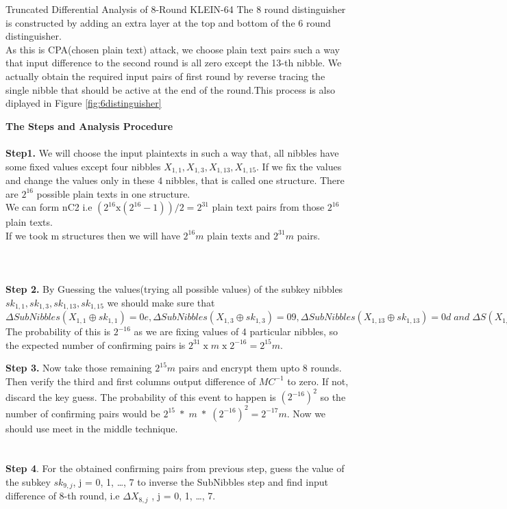 \begin{frame}{Truncated Differential Analysis of 8-Round KLEIN-64}
The 8 round distinguisher is constructed by adding an extra layer at the top and bottom of the 6 round distinguisher.\\
As this is CPA(chosen plain text) attack, we choose plain text pairs such a way that input difference to the second round is all zero except the 13-th nibble. We actually obtain the required input pairs of first round by reverse tracing the single nibble that should be active at the end of the round.This process is also diplayed in Figure \ref{fig:6distinguisher} \\
\end{frame}
\begin{frame}
\textbf{ The Steps and Analysis Procedure}\\ \\
\textbf{Step1.} We will choose the input plaintexts in such a way that, all nibbles have some fixed values except four nibbles $X_{1,1} , X_{1,3} , X_{1,13} , X_{1,15}$. If we fix the values and change the values only in these 4 nibbles, that is called one structure. There are $2^{16}$ possible plain texts in one structure.\\
We can form nC2 i.e $(2^{16} \text{x} (2^{16} - 1))/2 = 2^{31}$ plain text pairs from those $2^{16} $ plain texts.\\ If we took m structures then we will have $2^{16}m$ plain texts and $2^{31}m$ pairs.\\ \\ \\ \\
\textbf{Step 2.} By Guessing the values(trying all possible values)  of the subkey nibbles $sk_{1,1} , sk_{1,3} , sk_{1,13} , sk_{1,15}$ we should make sure that $\Delta SubNibbles(X_{1,1} \oplus sk_{1,1} ) = 0e, \Delta SubNibbles(X_{1,3} \oplus sk_{1,3} ) = 09, \Delta SubNibbles(X_{1,13} \oplus sk_{1,13} ) =
0d\; and \;\Delta S(X_{1,15} \oplus sk_{1,15} ) = 0b.$ The probability of this is $2^{-16}$ as we are fixing values of 4 particular nibbles, so the expected number of confirming pairs is $2^{31} \;\text{x}\; m\; \text{x} \;2^{-16} = 2^{15} m$. 

\end{frame}
\begin{frame}
\textbf{Step 3.} Now take those remaining $2^{15}m$ pairs and encrypt them upto 8 rounds. Then verify the third and first columns output difference of $MC^{-1}$  to zero. If not, discard the key guess. The probability of this event to happen is $(2 ^{-16})^{2}$ so the number of confirming pairs would be $2^{15} \;*\; m \;*\; (2 ^{-16})^{2} = 2^{-17}m$. Now we should use meet in the middle technique. \\ \\ \\
\textbf{Step 4}. For the obtained confirming pairs from previous step,  guess the value of the subkey $sk_{9,j}$, j = 0, 1, \ldots, 7 to inverse the SubNibbles step and find input difference of 8-th round, i.e $\Delta X_{8,j}$ , j = 0, 1, \ldots, 7. \\ \\
\end{frame}

